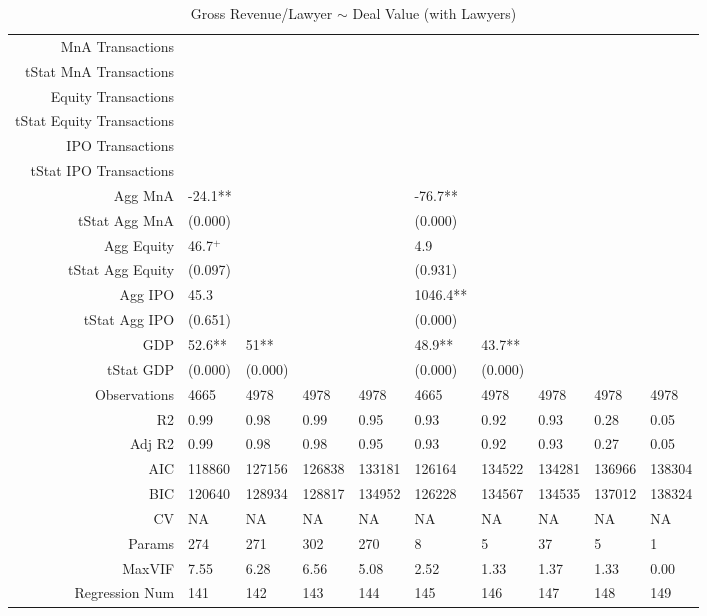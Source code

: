 \begin{table}[ht]
\begin{tabular}{rlllllllll}
  MnA Transactions &  &  &  &  &  &  &  &  &  \\ 
  tStat MnA Transactions &  &  &  &  &  &  &  &  &  \\ 
  Equity Transactions &  &  &  &  &  &  &  &  &  \\ 
  tStat Equity Transactions &  &  &  &  &  &  &  &  &  \\ 
  IPO Transactions &  &  &  &  &  &  &  &  &  \\ 
  tStat IPO Transactions &  &  &  &  &  &  &  &  &  \\ 
  Agg MnA & -24.1** &  &  &  & -76.7** &  &  &  &  \\ 
  tStat Agg MnA & (0.000) &  &  &  & (0.000) &  &  &  &  \\ 
  Agg Equity & 46.7$^{+}$ &  &  &  & 4.9 &  &  &  &  \\ 
  tStat Agg Equity & (0.097) &  &  &  & (0.931) &  &  &  &  \\ 
  Agg IPO & 45.3 &  &  &  & 1046.4** &  &  &  &  \\ 
  tStat Agg IPO & (0.651) &  &  &  & (0.000) &  &  &  &  \\ 
  GDP & 52.6** & 51** &  &  & 48.9** & 43.7** &  &  &  \\ 
  tStat GDP & (0.000) & (0.000) &  &  & (0.000) & (0.000) &  &  &  \\ 
  Observations & 4665 & 4978 & 4978 & 4978 & 4665 & 4978 & 4978 & 4978 & 4978 \\ 
  R2 & 0.99 & 0.98 & 0.99 & 0.95 & 0.93 & 0.92 & 0.93 & 0.28 & 0.05 \\ 
  Adj R2 & 0.99 & 0.98 & 0.98 & 0.95 & 0.93 & 0.92 & 0.93 & 0.27 & 0.05 \\ 
  AIC & 118860 & 127156 & 126838 & 133181 & 126164 & 134522 & 134281 & 136966 & 138304 \\ 
  BIC & 120640 & 128934 & 128817 & 134952 & 126228 & 134567 & 134535 & 137012 & 138324 \\ 
  CV & NA & NA & NA & NA & NA & NA & NA & NA & NA \\ 
  Params & 274 & 271 & 302 & 270 & 8 & 5 & 37 & 5 & 1 \\ 
  MaxVIF & 7.55 & 6.28 & 6.56 & 5.08 & 2.52 & 1.33 & 1.37 & 1.33 & 0.00 \\ 
  Regression Num & 141 & 142 & 143 & 144 & 145 & 146 & 147 & 148 & 149 \\ 
   \hline
\end{tabular}
\caption{Gross Revenue/Lawyer $\sim$ Deal Value (with Lawyers)} 
\end{table}
